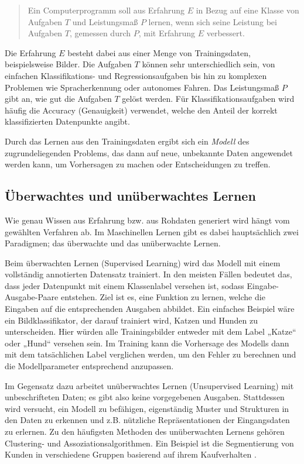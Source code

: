 \begin{quote}
	Ein Computerprogramm soll aus Erfahrung $E$ in Bezug auf eine Klasse von Aufgaben $T$ und Leistungsmaß $P$ lernen, wenn sich seine Leistung bei Aufgaben $T$, gemessen durch $P$, mit Erfahrung $E$ verbessert.
\end{quote}

Die Erfahrung $E$ besteht dabei aus einer Menge von Trainingsdaten, beispielsweise Bilder. Die Aufgaben $T$ können sehr unterschiedlich sein, von einfachen Klassifikations- und Regressionsaufgaben bis hin zu komplexen Problemen wie Spracherkennung oder autonomes Fahren. Das Leistungsmaß $P$ gibt an, wie gut die Aufgaben $T$ gelöst werden. Für Klassifikationsaufgaben wird häufig die Accuracy (Genauigkeit) verwendet, welche den Anteil der korrekt klassifizierten Datenpunkte angibt.

Durch das Lernen aus den Trainingsdaten ergibt sich ein \emph{Modell} des zugrundeliegenden Problems, das dann auf neue, unbekannte Daten angewendet werden kann, um Vorhersagen zu machen oder Entscheidungen zu treffen.

\subsection{Überwachtes und unüberwachtes Lernen} \label{subsec:sup-unsup}

Wie genau Wissen aus Erfahrung bzw. aus Rohdaten generiert wird hängt vom gewählten Verfahren ab. Im Maschinellen Lernen gibt es dabei hauptsächlich zwei Paradigmen; das überwachte und das unüberwachte Lernen.

Beim überwachten Lernen (Supervised Learning) wird das Modell mit einem vollständig annotierten Datensatz trainiert. In den meisten Fällen bedeutet das, dass jeder Datenpunkt mit einem Klassenlabel versehen ist, sodass Eingabe-Ausgabe-Paare entstehen. Ziel ist es, eine Funktion zu lernen, welche die Eingaben auf die entsprechenden Ausgaben abbildet. Ein einfaches Beispiel wäre ein Bildklassifikator, der darauf trainiert wird, Katzen und Hunden zu unterscheiden. Hier würden alle Trainingsbilder entweder mit dem Label „Katze“ oder „Hund“ versehen sein. Im Training kann die Vorhersage des Modells dann mit dem tatsächlichen Label verglichen werden, um den Fehler zu berechnen und die Modellparameter entsprechend anzupassen.

Im Gegensatz dazu arbeitet unüberwachtes Lernen (Unsupervised Learning) mit unbeschrifteten Daten; es gibt also keine vorgegebenen Ausgaben. Stattdessen wird versucht, ein Modell zu befähigen, eigenständig Muster und Strukturen in den Daten zu erkennen und z.B. nützliche Repräsentationen der Eingangsdaten zu erlernen. Zu den häufigsten Methoden des unüberwachten Lernens gehören Clustering- und Assoziationsalgorithmen. Ein Beispiel ist die Segmentierung von Kunden in verschiedene Gruppen basierend auf ihrem Kaufverhalten \parencite{Shen2021customersegmentation}.

